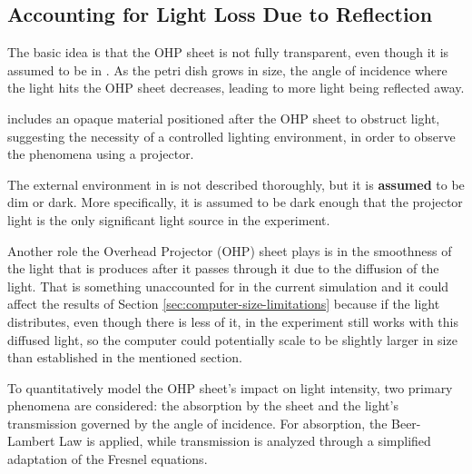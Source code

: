 \subsection{Accounting for Light Loss Due to Reflection} \label{sec:reflection-refraction}

The basic idea is that the OHP sheet is not fully transparent, even though it is assumed to be in \cite{gorecki2003chemical}.
As the petri dish grows in size, the angle of incidence where the light hits the OHP sheet decreases, leading to more light being reflected away.

\cite{gorecki2003chemical} includes an opaque material positioned after the OHP sheet to obstruct light, suggesting the necessity of a controlled lighting environment, in order to observe the phenomena using a projector.
\begin{tcolorbox}[colback=red!5!white,colframe=blue!75!black,title=Assumptions for Lighting Environment]
The external environment in \cite{gorecki2003chemical} is not described thoroughly, but it is \textbf{assumed} to be dim or dark.
More specifically, it is assumed to be dark enough that the projector light is the only significant light source in the experiment. 
\end{tcolorbox}

Another role the Overhead Projector (OHP) sheet plays is in the smoothness of the light that is produces after it passes through it due to 
the diffusion of the light. That is something unaccounted for in the current simulation and it could affect the results of Section \ref{sec:computer-size-limitations}
because if the light distributes, even though there is less of it, in \cite{gorecki2003chemical} the experiment still works with this diffused light, so 
the computer could potentially scale to be slightly larger in size than established in the mentioned section.


To quantitatively model the OHP sheet's impact on light intensity, two primary phenomena are considered: the absorption by the sheet and the light's transmission governed by the angle of incidence. For absorption, the Beer-Lambert Law is applied, while transmission is analyzed through a simplified adaptation of the Fresnel equations.

